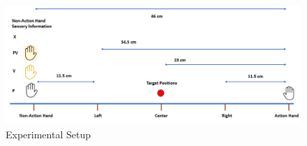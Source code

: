 \begin{figure}
\centering       
    \includegraphics[width=\textwidth, keepaspectratio]{Images/exp1_task.png}
    \caption{Experimental Setup}
    \label{fig:exp1-task}
\end{figure}